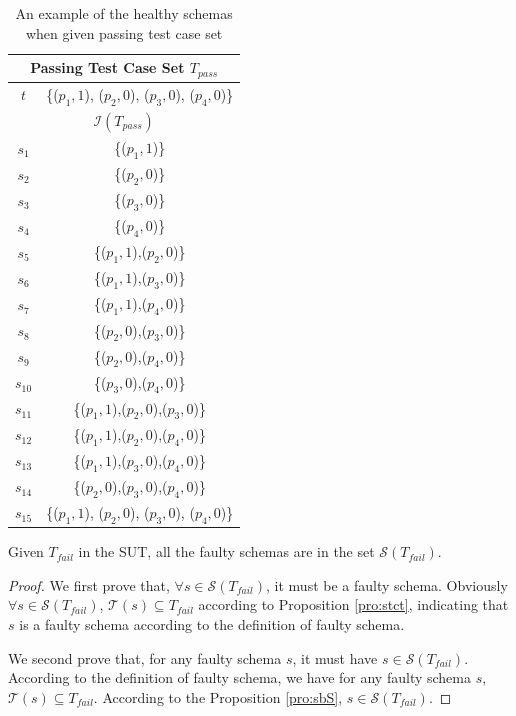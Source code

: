 \begin{table}[htbp]
  \centering
  \caption{An example of the healthy schemas when given passing test case set}
      \label{ex:wholesetofhealthyschemas}
    \begin{tabular}{|c|c|} \hline
   \multicolumn{2}{|c|}{\textbf{Passing Test Case Set $T_{pass}$}} \\ \hline
   $t$ & \{($p_{1}, 1$), ($p_{2}, 0$), ($p_{3}, 0$), ($p_{4}, 0$)\} \\ \hline
    \multicolumn{2}{|c|}{\textbf{ $\mathcal{I}(T_{pass})$ }}\\ \hline
   $s_{1}$ & \{($p_{1}, 1$)\} \\
   $s_{2}$ & \{($p_{2}, 0$)\} \\
   $s_{3}$ & \{($p_{3}, 0$)\} \\
   $s_{4}$ & \{($p_{4}, 0$)\} \\
   $s_{5}$ & \{($p_{1}, 1$),($p_{2}, 0$)\} \\
   $s_{6}$ & \{($p_{1}, 1$),($p_{3}, 0$)\} \\
   $s_{7}$ & \{($p_{1}, 1$),($p_{4}, 0$)\} \\
   $s_{8}$ & \{($p_{2}, 0$),($p_{3}, 0$)\} \\
   $s_{9}$ & \{($p_{2}, 0$),($p_{4}, 0$)\} \\
   $s_{10}$ & \{($p_{3}, 0$),($p_{4}, 0$)\} \\
   $s_{11}$ & \{($p_{1}, 1$),($p_{2}, 0$),($p_{3}, 0$)\} \\
   $s_{12}$ & \{($p_{1}, 1$),($p_{2}, 0$),($p_{4}, 0$)\} \\
   $s_{13}$ & \{($p_{1}, 1$),($p_{3}, 0$),($p_{4}, 0$)\} \\
   $s_{14}$ & \{($p_{2}, 0$),($p_{3}, 0$),($p_{4}, 0$)\} \\
   $s_{15}$ & \{($p_{1}, 1$), ($p_{2}, 0$), ($p_{3}, 0$), ($p_{4}, 0$)\} \\ \hline
    \end{tabular}%
\end{table}%


\begin{proposition}\label{pro:faultyschemastests}
Given  $T_{fail}$ in the SUT, all the faulty schemas are in the set $\mathcal{S}(T_{fail})$.
\end{proposition}

\begin{proof}
We first prove that, $\forall s \in \mathcal{S}(T_{fail})$, it must be a faulty schema.
Obviously $\forall s \in \mathcal{S}(T_{fail})$, $\mathcal{T}(s) \subseteq T_{fail}$ according to Proposition \ref{pro:stct}, indicating that $s$ is a faulty schema according to the definition of faulty schema.

We second prove that, for any faulty schema $s$, it must have $s \in \mathcal{S}(T_{fail})$.
According to the definition of faulty schema, we have for any faulty schema $s$, $\mathcal{T}(s) \subseteq T_{fail}$.
According to the Proposition \ref{pro:sbS}, $s \in \mathcal{S}(T_{fail})$.
\end{proof}

